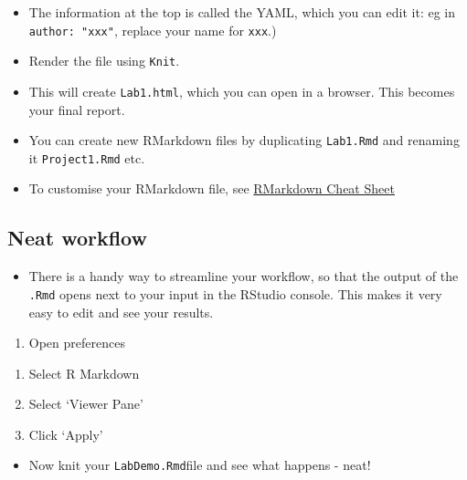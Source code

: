 \documentclass[]{article}
\providecommand{\tightlist}{%
  \setlength{\itemsep}{0pt}\setlength{\parskip}{0pt}}
\begin{document}
\begin{itemize}
\item
  The information at the top is called the YAML, which you can edit it: eg in \texttt{author:\ "xxx"}, replace your name for \texttt{xxx}.)
\item
  Render the file using \texttt{Knit}.
\end{itemize}

\begin{itemize}
\tightlist
\item
  This will create \texttt{Lab1.html}, which you can open in a browser. This becomes your final report.
\end{itemize}

\begin{itemize}
\item
  You can create new RMarkdown files by duplicating \texttt{Lab1.Rmd} and renaming it \texttt{Project1.Rmd} etc.
\item
  To customise your RMarkdown file, see
  \href{https://www.rstudio.com/wp-content/uploads/2015/02/rmarkdown-cheatsheet.pdf}{RMarkdown Cheat Sheet}
\end{itemize}

\hypertarget{neat-workflow}{%
\subsection{Neat workflow}\label{neat-workflow}}

\begin{itemize}
\tightlist
\item
  There is a handy way to streamline your workflow, so that the output of the \texttt{.Rmd} opens next to your input in the RStudio console. This makes it very easy to edit and see your results.
\end{itemize}

\begin{enumerate}
\def\labelenumi{\arabic{enumi}.}
\tightlist
\item
  Open preferences
\end{enumerate}

\begin{enumerate}
\def\labelenumi{\arabic{enumi}.}
\setcounter{enumi}{1}
\item
  Select R Markdown
\item
  Select `Viewer Pane'
\item
  Click `Apply'
\end{enumerate}

\begin{itemize}
\tightlist
\item
  Now knit your \texttt{LabDemo.Rmd\textquotesingle{}}file and see what happens - neat!
\end{itemize}
\end{document}
